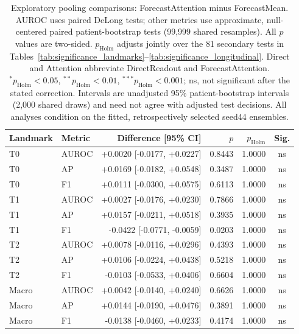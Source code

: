 \begin{table}[t]
\centering
\small
\caption{Exploratory pooling comparisons: ForecastAttention minus ForecastMean. AUROC uses paired DeLong tests; other metrics use approximate, null-centered paired patient-bootstrap tests (99,999 shared resamples). All $p$ values are two-sided. $p_{\mathrm{Holm}}$ adjusts jointly over the 81 secondary tests in Tables~\ref{tab:significance_landmarks}--\ref{tab:significance_longitudinal}. Direct and Attention abbreviate DirectReadout and ForecastAttention. $^{*}p_{\mathrm{Holm}}<0.05$, $^{**}p_{\mathrm{Holm}}<0.01$, $^{***}p_{\mathrm{Holm}}<0.001$; ns, not significant after the stated correction. Intervals are unadjusted 95\% patient-bootstrap intervals (2,000 shared draws) and need not agree with adjusted test decisions. All analyses condition on the fitted, retrospectively selected seed44 ensembles.}
\label{tab:significance_pooling}
\begin{tabular}{llrrrc}
\toprule
Landmark & Metric & Difference [95\% CI] & $p$ & $p_{\mathrm{Holm}}$ & Sig. \\
\midrule
T0 & AUROC & +0.0020 [-0.0177, +0.0227] & 0.8443 & 1.0000 & ns \\
T0 & AP & +0.0169 [-0.0182, +0.0548] & 0.3487 & 1.0000 & ns \\
T0 & F1 & +0.0111 [-0.0300, +0.0575] & 0.6113 & 1.0000 & ns \\
T1 & AUROC & +0.0027 [-0.0176, +0.0230] & 0.7866 & 1.0000 & ns \\
T1 & AP & +0.0157 [-0.0211, +0.0518] & 0.3935 & 1.0000 & ns \\
T1 & F1 & -0.0422 [-0.0771, -0.0059] & 0.0203 & 1.0000 & ns \\
T2 & AUROC & +0.0078 [-0.0116, +0.0296] & 0.4393 & 1.0000 & ns \\
T2 & AP & +0.0106 [-0.0224, +0.0438] & 0.5218 & 1.0000 & ns \\
T2 & F1 & -0.0103 [-0.0533, +0.0406] & 0.6604 & 1.0000 & ns \\
Macro & AUROC & +0.0042 [-0.0140, +0.0240] & 0.6626 & 1.0000 & ns \\
Macro & AP & +0.0144 [-0.0190, +0.0476] & 0.3891 & 1.0000 & ns \\
Macro & F1 & -0.0138 [-0.0460, +0.0233] & 0.4174 & 1.0000 & ns \\
\bottomrule
\end{tabular}
\end{table}

